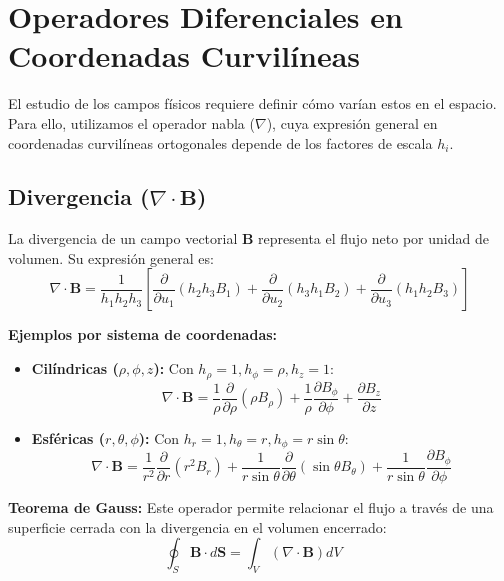 \documentclass[a4paper]{article}
\begin{document}
\section{Operadores Diferenciales en Coordenadas Curvilíneas}

El estudio de los campos físicos requiere definir cómo varían estos en el espacio. Para ello, utilizamos el operador nabla ($\nabla$), cuya expresión general en coordenadas curvilíneas ortogonales depende de los factores de escala $h_i$.

\subsection{Divergencia ($\nabla \cdot \mathbf{B}$)}

La divergencia de un campo vectorial $\mathbf{B}$ representa el flujo neto por unidad de volumen. Su expresión general es:
\begin{equation}
    \nabla \cdot \mathbf{B} = \frac{1}{h_1 h_2 h_3} \left[ \frac{\partial}{\partial u_1}(h_2 h_3 B_1) + \frac{\partial}{\partial u_2}(h_3 h_1 B_2) + \frac{\partial}{\partial u_3}(h_1 h_2 B_3) \right]
\end{equation}

\textbf{Ejemplos por sistema de coordenadas:}
\begin{itemize}
    \item \textbf{Cilíndricas ($\rho, \phi, z$):} Con $h_\rho = 1, h_\phi = \rho, h_z = 1$:
    \begin{equation}
        \nabla \cdot \mathbf{B} = \frac{1}{\rho} \frac{\partial}{\partial \rho}(\rho B_\rho) + \frac{1}{\rho} \frac{\partial B_\phi}{\partial \phi} + \frac{\partial B_z}{\partial z}
    \end{equation}
    \item \textbf{Esféricas ($r, \theta, \phi$):} Con $h_r = 1, h_\theta = r, h_\phi = r \sin\theta$:
    \begin{equation}
        \nabla \cdot \mathbf{B} = \frac{1}{r^2} \frac{\partial}{\partial r}(r^2 B_r) + \frac{1}{r \sin\theta} \frac{\partial}{\partial \theta}(\sin\theta B_\theta) + \frac{1}{r \sin\theta} \frac{\partial B_\phi}{\partial \phi}
    \end{equation}
\end{itemize}

\textbf{Teorema de Gauss:} Este operador permite relacionar el flujo a través de una superficie cerrada con la divergencia en el volumen encerrado:
\begin{equation}
    \oint_S \mathbf{B} \cdot d\mathbf{S} = \int_V (\nabla \cdot \mathbf{B}) dV \quad
\end{equation}
\end{document}
